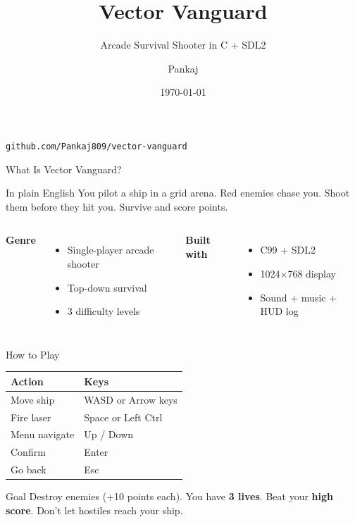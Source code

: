 \documentclass[aspectratio=169,10pt]{beamer}
\title{Vector Vanguard}
\subtitle{Arcade Survival Shooter in C + SDL2}
\author{Pankaj}
\institute{Software Engineering Demo}
\date{\today}
\begin{document}
\begin{frame}
  \titlepage
  \vspace{-0.5cm}
  \begin{center}
    \small \texttt{github.com/Pankaj809/vector-vanguard}
  \end{center}
\end{frame}

\begin{frame}{What Is Vector Vanguard?}
  \begin{block}{In plain English}
    You pilot a ship in a grid arena. Red enemies chase you.
    Shoot them before they hit you. Survive and score points.
  \end{block}
  \vspace{0.4cm}
  \begin{columns}[T]
    \textbf{Genre}
    \begin{itemize}
      \item Single-player arcade shooter
      \item Top-down survival
      \item 3 difficulty levels
    \end{itemize}
    \textbf{Built with}
    \begin{itemize}
      \item C99 + SDL2
      \item 1024$\times$768 display
      \item Sound + music + HUD log
    \end{itemize}
  \end{columns}
\end{frame}

\begin{frame}{How to Play}
  \begin{table}
    \centering
    \begin{tabular}{@{}ll@{}}
      \toprule
      \textbf{Action} & \textbf{Keys} \\
      \midrule
      Move ship       & WASD or Arrow keys \\
      Fire laser      & Space or Left Ctrl \\
      Menu navigate   & Up / Down \\
      Confirm         & Enter \\
      Go back         & Esc \\
      \bottomrule
    \end{tabular}
  \end{table}
  \vspace{0.3cm}
  \begin{alertblock}{Goal}
    Destroy enemies (+10 points each). You have \textbf{3 lives}.
    Beat your \textbf{high score}. Don't let hostiles reach your ship.
  \end{alertblock}
\end{frame}
\end{document}

